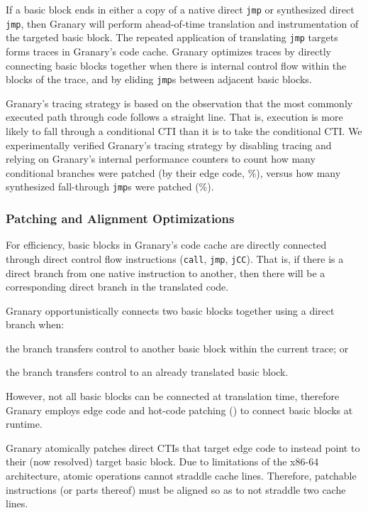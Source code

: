 \documentclass[preprint]{sigplanconf}
\begin{document}
If a basic block ends in either a copy of a native direct \texttt{jmp} or synthesized direct \texttt{jmp}, then Granary will perform ahead-of-time translation and instrumentation of the targeted basic block. The repeated application of translating \texttt{jmp} targets forms traces in Granary's code cache. Granary optimizes traces by directly connecting basic blocks together when there is internal control flow within the blocks of the trace, and by eliding \texttt{jmp}s between adjacent basic blocks.

Granary's tracing strategy is based on the observation that the most commonly executed path through code follows a straight line. That is, execution is more likely to fall through a conditional CTI than it is to take the conditional CTI. We experimentally verified Granary's tracing strategy by disabling tracing and relying on Granary's internal performance counters to count how many conditional branches were patched (by their edge code, \%), versus how many synthesized fall-through \texttt{jmp}s were patched (\%).

\subsubsection{Patching and Alignment  Optimizations}\label{sec:patching}
For efficiency, basic blocks in Granary's code cache are directly connected through direct control flow instructions (\texttt{call}, \texttt{jmp}, \texttt{jCC}). That is, if there is a direct branch from one native instruction to another, then there will be a corresponding direct branch in the translated code.

Granary opportunistically connects two basic blocks together using a direct branch when: \begin{inparaenum}[i)]
	\item the branch transfers control to another basic block within the current trace; or
	\item the branch transfers control to an already translated basic block.
\end{inparaenum} However, not all basic blocks can be connected at translation time, therefore Granary employs edge code and hot-code patching () to connect basic blocks at runtime.

Granary atomically patches direct CTIs that target edge code to instead point to their (now resolved) target basic block. Due to limitations of the x86-64 architecture, atomic operations cannot straddle cache lines. Therefore, patchable instructions (or parts thereof) must be aligned so as to not straddle two cache lines.
\end{document}
